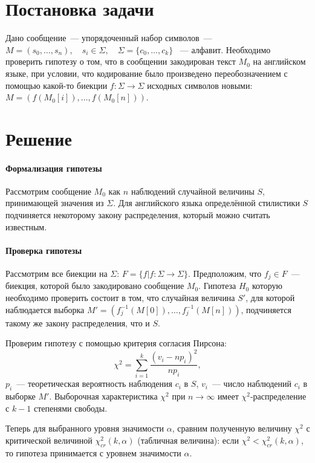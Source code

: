 \documentclass[a4paper,10pt]{article}
\begin{document}



\section{Постановка задачи}
Дано сообщение~--- упорядоченный набор символов~--- 
$M = (s_0, \ldots, s_n), \quad s_i \in \Sigma, \quad \Sigma = \{ c_0, \ldots, c_k \}$%
~--- алфавит.
Необходимо проверить гипотезу о том, что в сообщении закодирован текст $M_0$
на английском языке, при условии, что кодирование было произведено 
переобозначением с помощью какой-то биекции 
$f \colon \Sigma \rightarrow \Sigma$ 
исходных символов новыми: 
$M = (f(M_0[i]), \ldots, f(M_0[n]))$.

\section{Решение}
\paragraph{Формализация гипотезы}
Рассмотрим сообщение $M_0$ как $n$ наблюдений случайной величины $S$, 
принимающей значения из $\Sigma$.
Для английского языка определённой стилистики $S$ подчиняется некоторому
закону распределения, который можно считать известным.

\paragraph{Проверка гипотезы}
Рассмотрим все биекции на $\Sigma$: 
$F = \{ f | f \colon \Sigma \rightarrow \Sigma \}$.
Предположим, что $f_j \in F$~--- биекция, которой было закодировано сообщение 
$M_0$.
Гипотеза $H_0$ которую необходимо проверить состоит в том, 
что случайная величина $S'$, для которой наблюдается выборка 
$M' = (f_j^{-1}(M[0]), \ldots, f_j^{-1}(M[n]))$,
подчиняется такому же закону распределения, что и $S$.

Проверим гипотезу с помощью критерия согласия Пирсона:
$$ \chi^2 = \sum_{i=1}^{k}\frac{(v_i - n p_i)^2}{n p_i}, $$
$p_i$~--- теоретическая вероятность наблюдения $c_i$ в $S$,
$v_i$~--- число наблюдений $c_i$ в выборке $M'$.
Выборочная характеристика $\chi^2$ при $n \rightarrow \infty$ имеет 
$\chi^2$-распределение с $k - 1$ степенями свободы.

Теперь для выбранного уровня значимости $\alpha$, сравним полученную величину
$\chi^2$ с критической величиной $\chi^2_{cr}(k, \alpha)$ (табличная величина): 
если $\chi^2 < \chi^2_{cr}(k, \alpha)$, то гипотеза принимается 
с уровнем значимости $\alpha$.
\end{document}
